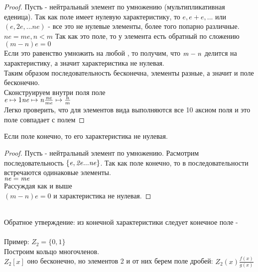 \begin{proof}
	Пусть  - нейтральный элемент по умножению (мультипликативная еденица).
	Так как поле имеет нулевую характеристику, то $\mathit {e, e+e, ...}$ или
	$\mathit {(e, 2e, ... ne)}$ - все это не нулевые элементы, более того попарно
	различные.\\
	$\mathit {ne = me, n < m}$ Так как это поле, то у элемента  есть
	обратный по сложению $\mathit {(m-n)e=0}$ \\
	Если это равенство умножить на любой , то получим, что $\mathit {m-n}$ делится на
	характеристику, а значит характеристика не нулевая.\\
	Таким образом последовательность бесконечна, элементы разные, а значит и поле
	бесконечно.\\
	Сконструируем внутри поля  поле  \\
	$\mathit {e} \mapsto 1 \\
	\mathit {ne} \mapsto \mathit {n} \\
	\frac{ne}{me} \mapsto \frac{n}{m}$ \\

	Легко проверить, что для элементов вида  выполняются все 10 аксиом
	поля и это поле совпадает с полем 
	\end{proof}

\begin{theorem}
	Если поле конечно, то его характеристика не нулевая.
\end{theorem}

\begin{proof}
	Пусть  - нейтральный элемент по умножению. Расмотрим последовательность
	$\mathit {\{e,2e...ne\}}$. Так как поле конечно, то в последовательности
	встречаются одинаковые элементы.\\
	$\mathit{ne=me}$ \\
	Рассуждая как и выше \\
	$\mathit {(m-n)e=0}$ и характеристика не нулевая.
\end{proof}

 \\
Обратное утверждение: из конечной характеристики следует конечное поле -
 \\

\\
Пример: $Z_{2} = \{0,1\}$ \\
Построим кольцо многочленов. \\
$Z_{2}[x]$ оно бесконечно, но элементов 2 и от них берем поле дробей:
$Z_{2}(x) \frac{f(x)}{g(x)}$ \\

